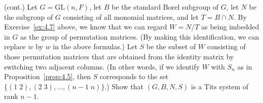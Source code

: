 \documentclass[../Odyssey_Project.tex]{subfiles}
\begin{document}
\begin{exercise}
\label{ex:4.8}
(cont.) Let $G = \mathrm{GL}(n, F)$, let $B$ be the standard Borel subgroup of $G$, let $N$ be the subgroup of $G$ consisting of all monomial matrices, and let $T = B \cap N$. By Exercise~\ref{ex:4.7} above, we know that we can regard $W = N/T$ as being imbedded in $G$ as the group of permutation matrices. (By making this identification, we can replace $\dot{w}$ by $w$ in the above formulas.) Let $S$ be the subset of $W$ consisting of those permutation matrices that are obtained from the identity matrix by switching two adjacent columns. (In other words, if we identify $W$ with $S_n$ as in Proposition~\ref{prop:4.5}, then $S$ corresponds to the set $\{(1\;2), (2\;3), \ldots, (n-1\;n)\}$.) Show that $(G, B, N, S)$ is a Tits system of rank $n - 1$.
\end{exercise}
\end{document}
